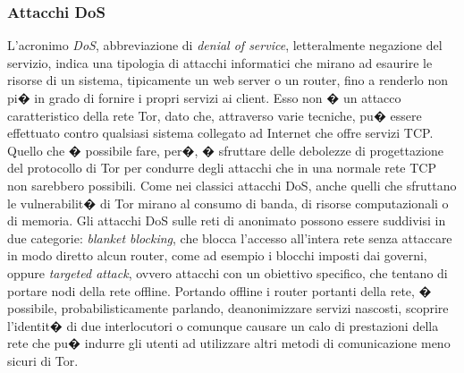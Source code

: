 

%







\subsubsection{Attacchi DoS}
L'acronimo \emph{DoS}, abbreviazione di \emph{denial of service}, letteralmente negazione del servizio, indica una tipologia di attacchi informatici che mirano ad esaurire le risorse di un sistema, tipicamente un web server o un router, fino a renderlo non pi� in grado di fornire i propri servizi ai client. Esso non � un attacco caratteristico della rete Tor, dato che, attraverso varie tecniche, pu� essere effettuato contro qualsiasi sistema collegato ad Internet che offre servizi TCP. Quello che � possibile fare, per�, � sfruttare delle debolezze di progettazione del protocollo di Tor per condurre degli attacchi che in una normale rete TCP non sarebbero possibili. Come nei classici attacchi DoS, anche quelli che sfruttano le vulnerabilit� di Tor mirano al consumo di banda, di risorse computazionali o di memoria. Gli attacchi DoS sulle reti di anonimato possono essere suddivisi in due categorie: \emph{blanket blocking}, che blocca l'accesso all'intera rete senza attaccare in modo diretto alcun router, come ad esempio i blocchi imposti dai governi, oppure \emph{targeted attack}, ovvero attacchi con un obiettivo specifico, che tentano di portare nodi della rete offline. Portando offline i router portanti della rete, � possibile, probabilisticamente parlando, deanonimizzare servizi nascosti, scoprire l'identit� di due interlocutori o comunque causare un calo di prestazioni della rete che pu� indurre gli utenti ad utilizzare altri metodi di comunicazione meno sicuri di Tor. 



